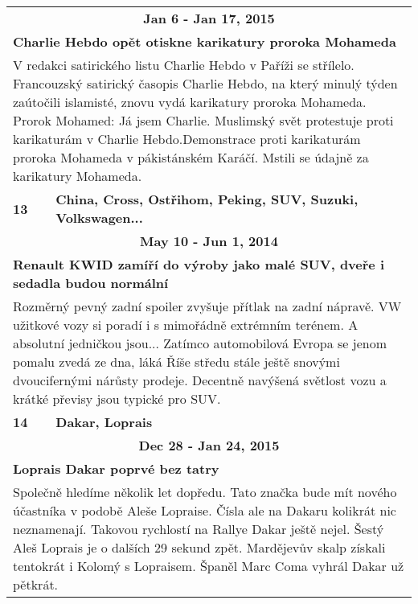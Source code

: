 \begin{tabularx}{\linewidth}{l l}
                \multicolumn{2}{c}{\bf Jan 6 - Jan 17, 2015} \\
                \multicolumn{2}{p{\linewidth}}{\bf Charlie Hebdo opět otiskne karikatury proroka Mohameda} \\
                \multicolumn{2}{p{\linewidth}}{V redakci satirického listu Charlie Hebdo v Paříži se střílelo. Francouzský satirický časopis Charlie Hebdo, na který minulý týden zaútočili islamisté, znovu vydá karikatury proroka Mohameda. Prorok Mohamed: Já jsem Charlie. Muslimský svět protestuje proti karikaturám v Charlie Hebdo.Demonstrace proti karikaturám proroka Mohameda v pákistánském Karáčí. Mstili se údajně za karikatury Mohameda.} \\ \midrule
                [1.5pt]

            \bf 13 & \bf China, Cross, Ostřihom, Peking, SUV, Suzuki, Volkswagen... \\ \midrule
            
                \multicolumn{2}{c}{\bf May 10 - Jun 1, 2014} \\
                \multicolumn{2}{p{\linewidth}}{\bf Renault KWID zamíří do výroby jako malé SUV, dveře i sedadla budou normální} \\
                \multicolumn{2}{p{\linewidth}}{Rozměrný pevný zadní spoiler zvyšuje přítlak na zadní nápravě. VW užitkové vozy si poradí i s mimořádně extrémním terénem. A absolutní jedničkou jsou... Zatímco automobilová Evropa se jenom pomalu zvedá ze dna, láká Říše středu stále ještě snovými dvoucifernými nárůsty prodeje. Decentně navýšená světlost vozu a krátké převisy jsou typické pro SUV.} \\ \midrule
                [1.5pt]

            \bf 14 & \bf Dakar, Loprais \\ \midrule
            
                \multicolumn{2}{c}{\bf Dec 28 - Jan 24, 2015} \\
                \multicolumn{2}{p{\linewidth}}{\bf Loprais Dakar poprvé bez tatry} \\
                \multicolumn{2}{p{\linewidth}}{Společně hledíme několik let dopředu. Tato značka bude mít nového účastníka v podobě Aleše Lopraise. Čísla ale na Dakaru kolikrát nic neznamenají. Takovou rychlostí na Rallye Dakar ještě nejel. Šestý Aleš Loprais je o dalších 29 sekund zpět. Mardějevův skalp získali tentokrát i Kolomý s Lopraisem. Španěl Marc Coma vyhrál Dakar už pětkrát.} \\ \midrule
                [1.5pt]


\end{tabularx}
